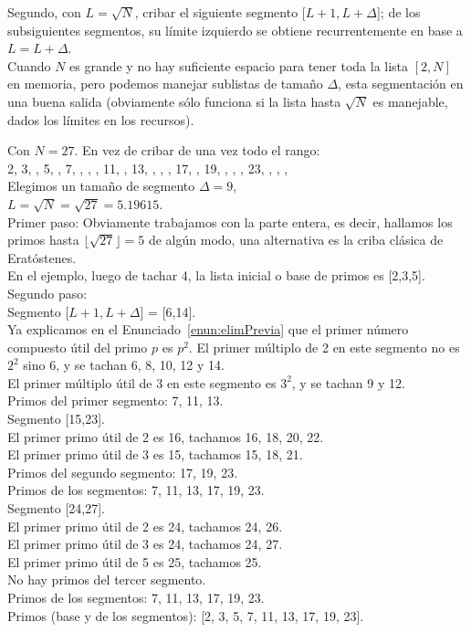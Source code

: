 Segundo, con $L = \sqrt{N}$, cribar el siguiente segmento [$L+1,L+\Delta$]; de los subsiguientes segmentos, su límite izquierdo se obtiene recurrentemente en base a $L = L+\Delta$.\\ 

Cuando $N$ es grande y no hay suficiente espacio para tener toda la lista $[2,N]$ en memoria, pero podemos manejar sublistas de tamaño $\Delta$, esta segmentación en una buena salida (obviamente sólo funciona si la lista hasta $\sqrt{N}$ es manejable, dados los límites en los recursos).

\begin{ejemplo} Con $N=27$. En vez de cribar de una vez todo el rango: \\
2, 3, , 5, , 7, , , , 11, , 13, , , , 17, , 19, , , , 23, , , , \\
Elegimos un tamaño de segmento $\Delta = 9$,\\
$L = \sqrt{N} = \sqrt{27} = 5.19615$. \\
Primer paso: Obviamente trabajamos con la parte entera, es decir, hallamos los primos hasta $\lfloor\sqrt{27}\rfloor = 5$ de algún modo, una alternativa es la criba clásica de Eratóstenes.\\
En el ejemplo, luego de tachar 4, la lista inicial o base de primos es [2,3,5].\\
Segundo paso:\\
Segmento [$L+1,L+\Delta$] = [6,14].\\
Ya explicamos en el Enunciado~\ref{enun:elimPrevia} que el primer número compuesto útil del primo $p$ es $p^{2}$.
El primer múltiplo de 2 en este segmento no es $2^{2}$ sino 6, y se tachan 6, 8, 10, 12 y 14.\\
El primer múltiplo útil de 3 en este segmento es $3^{2}$, y se tachan 9 y 12.\\
Primos del primer segmento: 7, 11, 13.\\
Segmento [15,23].\\
El primer primo útil de 2 es 16, tachamos 16, 18, 20, 22.\\
El primer primo útil de 3 es 15, tachamos 15, 18, 21.\\
Primos del segundo segmento: 17, 19, 23.\\
Primos de los segmentos: 7, 11, 13, 17, 19, 23.\\
Segmento [24,27].\\
El primer primo útil de 2 es 24, tachamos 24, 26.\\
El primer primo útil de 3 es 24, tachamos 24, 27.\\
El primer primo útil de 5 es 25, tachamos 25.\\
No hay primos del tercer segmento.\\
Primos de los segmentos: 7, 11, 13, 17, 19, 23.\\
Primos (base y de los segmentos): [2, 3, 5, 7, 11, 13, 17, 19, 23].
\end{ejemplo}
